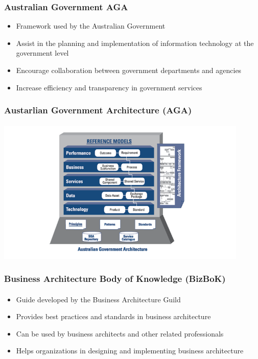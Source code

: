 \documentclass[aspectratio=169, table]{beamer}
\begin{document}
    \begin{frame}
        \frametitle{Australian Government AGA}
        \begin{itemize}
            \item Framework used by the Australian Government
            \item Assist in the planning and implementation of information technology at the government level
            \item Encourage collaboration between government departments and agencies
            \item Increase efficiency and transparency in government services
        \end{itemize}
    \end{frame}

    {
        \begin{frame}
            \frametitle{Austarlian Government Architecture (AGA)}
            \framesubtitle{\hspace{1cm}}
            \begin{center}
                \includegraphics[width=0.9\textwidth]{../figures/aga}
            \end{center}
        \end{frame}
    }

    \begin{frame}
        \frametitle{Business Architecture Body of Knowledge (BizBoK)}
        \framesubtitle{\hspace{1cm}}
        \begin{itemize}
            \item Guide developed by the Business Architecture Guild
            \item Provides best practices and standards in business architecture
            \item Can be used by business architects and other related professionals
            \item Helps organizations in designing and implementing business architecture
        \end{itemize}
    \end{frame}
\end{document}
